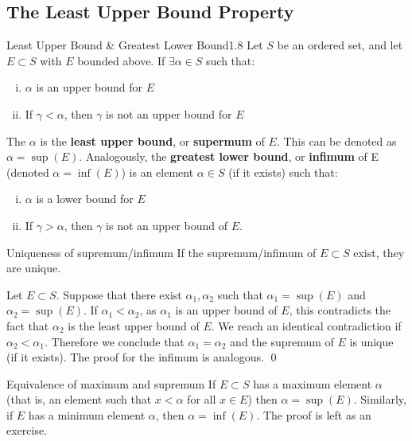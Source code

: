 \subsection{The Least Upper Bound Property}
\begin{definition}{Least Upper Bound \& Greatest Lower Bound}{1.8}
    Let $S$ be an ordered set, and let $E \subset S$ with $E$ bounded above. If $\exists \alpha \in S$ such that:
    \begin{enumerate}[(i)]
        \item $\alpha$ is an upper bound for $E$
        \item If $\gamma < \alpha$, then $\gamma$ is not an upper bound for $E$
    \end{enumerate} 
    The $\alpha$ is the \textbf{least upper bound}, or \textbf{supermum} of $E$. This can be denoted as $\alpha = \sup(E)$. Analogously, the \textbf{greatest lower bound}, or \textbf{infimum} of E (denoted $\alpha = \inf(E)$) is an element $\alpha \in S$ (if it exists) such that:
    \begin{enumerate}[(i)]
        \item $\alpha$ is a lower bound for $E$
        \item If $\gamma > \alpha$, then $\gamma$ is not an upper bound of $E$. 
    \end{enumerate}
\end{definition}

\begin{ntheorem}{Uniqueness of supremum/infimum}
    If the supremum/infimum of $E \subset S$ exist, they are unique.
\end{ntheorem}
\begin{nproof}
        Let $E \subset S$. Suppose that there exist $\alpha_1, \alpha_2$ such that $\alpha_1 = \sup(E)$ and $\alpha_2 = \sup(E)$. If $\alpha_1 < \alpha_2$, as $\alpha_1$ is an upper bound of $E$, this contradicts the fact that $\alpha_2$ is the least upper bound of $E$. We reach an identical contradiction if $\alpha_2 < \alpha_1$. Therefore we conclude that $\alpha_1 = \alpha_2$ and the supremum of $E$ is unique (if it exists). The proof for the infimum is analogous. \qed
\end{nproof}

\begin{ntheorem}{Equivalence of maximum and supremum}
    If $E \subset S$ has a maximum element $\alpha$ (that is, an element such that $x < \alpha$ for all $x \in E$) then $\alpha = \sup(E)$. Similarly, if $E$ has a minimum element $\alpha$, then $\alpha = \inf(E)$. The proof is left as an exercise. 
\end{ntheorem}

